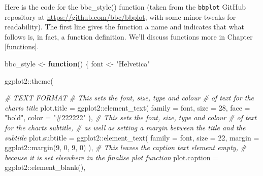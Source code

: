 \documentclass[
]{book}
\newenvironment{Shaded}{\begin{snugshade}}{\end{snugshade}}
\newcommand{\AttributeTok}[1]{\textcolor[rgb]{0.77,0.63,0.00}{#1}}
\newcommand{\CommentTok}[1]{\textcolor[rgb]{0.56,0.35,0.01}{\textit{#1}}}
\newcommand{\ControlFlowTok}[1]{\textcolor[rgb]{0.13,0.29,0.53}{\textbf{#1}}}
\newcommand{\DecValTok}[1]{\textcolor[rgb]{0.00,0.00,0.81}{#1}}
\newcommand{\FunctionTok}[1]{\textcolor[rgb]{0.00,0.00,0.00}{#1}}
\newcommand{\NormalTok}[1]{#1}
\newcommand{\OtherTok}[1]{\textcolor[rgb]{0.56,0.35,0.01}{#1}}
\newcommand{\SpecialCharTok}[1]{\textcolor[rgb]{0.00,0.00,0.00}{#1}}
\newcommand{\StringTok}[1]{\textcolor[rgb]{0.31,0.60,0.02}{#1}}
\begin{document}
Here is the code for the bbc\_style() function (taken from the \texttt{bbplot} GitHub repository at \url{https://github.com/bbc/bbplot}, with some minor tweaks for readability). The first line gives the function a name and indicates that what follows is, in fact, a function definition. We'll discuss functions more in Chapter \ref{functions}.

\begin{Shaded}
\begin{Highlighting}[]
\NormalTok{bbc\_style }\OtherTok{\textless{}{-}} \ControlFlowTok{function}\NormalTok{() \{}
\NormalTok{  font }\OtherTok{\textless{}{-}} \StringTok{"Helvetica"}
  
\NormalTok{  ggplot2}\SpecialCharTok{::}\FunctionTok{theme}\NormalTok{(}
    
    \CommentTok{\# TEXT FORMAT}
    \CommentTok{\# This sets the font, size, type and colour }
    \CommentTok{\# of text for the chart\textquotesingle{}s title}
    \AttributeTok{plot.title =}\NormalTok{ ggplot2}\SpecialCharTok{::}\FunctionTok{element\_text}\NormalTok{(}
      \AttributeTok{family =}\NormalTok{ font,}
      \AttributeTok{size =} \DecValTok{28}\NormalTok{,}
      \AttributeTok{face =} \StringTok{"bold"}\NormalTok{,}
      \AttributeTok{color =} \StringTok{"\#222222"}
\NormalTok{    ),}
    \CommentTok{\# This sets the font, size, type and colour}
    \CommentTok{\# of text for the chart\textquotesingle{}s subtitle,}
    \CommentTok{\# as well as setting a margin between the title and the subtitle}
    \AttributeTok{plot.subtitle =}\NormalTok{ ggplot2}\SpecialCharTok{::}\FunctionTok{element\_text}\NormalTok{(}
      \AttributeTok{family =}\NormalTok{ font,}
      \AttributeTok{size =} \DecValTok{22}\NormalTok{,}
      \AttributeTok{margin =}\NormalTok{ ggplot2}\SpecialCharTok{::}\FunctionTok{margin}\NormalTok{(}\DecValTok{9}\NormalTok{, }\DecValTok{0}\NormalTok{, }\DecValTok{9}\NormalTok{, }\DecValTok{0}\NormalTok{)}
\NormalTok{    ),}
    \CommentTok{\# This leaves the caption text element empty, }
    \CommentTok{\# because it is set elsewhere in the finalise plot function}
    \AttributeTok{plot.caption =}\NormalTok{ ggplot2}\SpecialCharTok{::}\FunctionTok{element\_blank}\NormalTok{(),}
    

\end{Highlighting}
\end{Shaded}
\end{document}
